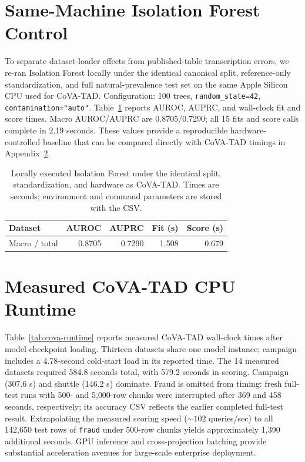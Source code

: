 \documentclass{article}
\begin{document}
\section{Same-Machine Isolation Forest Control}
\label{app:local-iforest}

To separate dataset-loader effects from published-table transcription errors, we re-ran Isolation Forest locally under the identical canonical split, reference-only standardization, and full natural-prevalence test set on the same Apple Silicon CPU used for CoVA-TAD. Configuration: 100 trees, \texttt{random\_state=42}, \texttt{contamination="auto"}. Table~\ref{tab:local-iforest} reports AUROC, AUPRC, and wall-clock fit and score times. Macro AUROC/AUPRC are 0.8705/0.7290; all 15 fits and score calls complete in 2.19 seconds. These values provide a reproducible hardware-controlled baseline that can be compared directly with CoVA-TAD timings in Appendix~\ref{app:runtime}.

\begin{table}[h]
\centering
\caption{Locally executed Isolation Forest under the identical split, standardization, and hardware as CoVA-TAD. Times are seconds; environment and command parameters are stored with the CSV.}
\label{tab:local-iforest}
\small
\setlength{\tabcolsep}{6pt}
\begin{tabular}{lrrrr}
\toprule
Dataset & AUROC & AUPRC & Fit (s) & Score (s)\\
\midrule
%
Macro / total & 0.8705 & 0.7290 & 1.508 & 0.679\\
\bottomrule
\end{tabular}
\end{table}

\section{Measured CoVA-TAD CPU Runtime}
\label{app:runtime}

Table~\ref{tab:cova-runtime} reports measured CoVA-TAD wall-clock times after model checkpoint loading. Thirteen datasets share one model instance; campaign includes a 4.78-second cold-start load in its reported time. The 14 measured datasets required 584.8 seconds total, with 579.2 seconds in scoring. Campaign (307.6 s) and shuttle (146.2 s) dominate. Fraud is omitted from timing: fresh full-test runs with 500- and 5{,}000-row chunks were interrupted after 369 and 458 seconds, respectively; its accuracy CSV reflects the earlier completed full-test result. Extrapolating the measured scoring speed ($\sim 102$ queries/sec) to all 142{,}650 test rows of \texttt{fraud} under 500-row chunks yields approximately 1{,}390 additional seconds. GPU inference and cross-projection batching provide substantial acceleration avenues for large-scale enterprise deployment.
\end{document}
